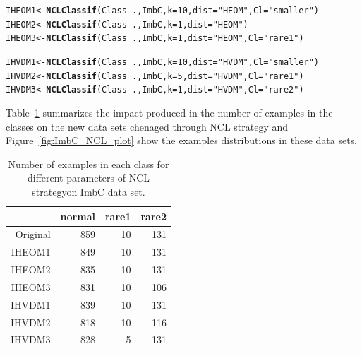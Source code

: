 \documentclass[10pt,a4paper]{article}\usepackage[]{graphicx}\usepackage[]{color}
\makeatletter
\newcommand{\hlnum}[1]{\textcolor[rgb]{0.686,0.059,0.569}{#1}}%
\newcommand{\hlstr}[1]{\textcolor[rgb]{0.192,0.494,0.8}{#1}}%
\newcommand{\hlopt}[1]{\textcolor[rgb]{0,0,0}{#1}}%
\newcommand{\hlstd}[1]{\textcolor[rgb]{0.345,0.345,0.345}{#1}}%
\newcommand{\hlkwb}[1]{\textcolor[rgb]{0.69,0.353,0.396}{#1}}%
\newcommand{\hlkwc}[1]{\textcolor[rgb]{0.333,0.667,0.333}{#1}}%
\newcommand{\hlkwd}[1]{\textcolor[rgb]{0.737,0.353,0.396}{\textbf{#1}}}%
\newenvironment{kframe}{%
 \def\at@end@of@kframe{}%
 \ifinner\ifhmode%
  \def\at@end@of@kframe{\end{minipage}}%
  \begin{minipage}{\columnwidth}%
 \fi\fi%
 \def\FrameCommand##1{\hskip\@totalleftmargin \hskip-\fboxsep
 \colorbox{shadecolor}{##1}\hskip-\fboxsep
     \hskip-\linewidth \hskip-\@totalleftmargin \hskip\columnwidth}%
 \MakeFramed {\advance\hsize-\width
   \@totalleftmargin\z@ \linewidth\hsize
   \@setminipage}}%
 {\par\unskip\endMakeFramed%
 \at@end@of@kframe}
\newenvironment{knitrout}{}{} %
\makeatother
\begin{document}
\begin{knitrout}\footnotesize
{}\color{fgcolor}\begin{kframe}
\begin{alltt}
\hlstd{IHEOM1} \hlkwb{<-} \hlkwd{NCLClassif}\hlstd{(Class}\hlopt{~}\hlstd{., ImbC,} \hlkwc{k}\hlstd{=}\hlnum{10}\hlstd{,} \hlkwc{dist}\hlstd{=}\hlstr{"HEOM"}\hlstd{,} \hlkwc{Cl}\hlstd{=}\hlstr{"smaller"}\hlstd{)}
\hlstd{IHEOM2} \hlkwb{<-} \hlkwd{NCLClassif}\hlstd{(Class}\hlopt{~}\hlstd{., ImbC,} \hlkwc{k}\hlstd{=}\hlnum{1}\hlstd{,} \hlkwc{dist}\hlstd{=}\hlstr{"HEOM"}\hlstd{)}
\hlstd{IHEOM3} \hlkwb{<-} \hlkwd{NCLClassif}\hlstd{(Class}\hlopt{~}\hlstd{., ImbC,} \hlkwc{k}\hlstd{=}\hlnum{1}\hlstd{,} \hlkwc{dist}\hlstd{=}\hlstr{"HEOM"}\hlstd{,} \hlkwc{Cl}\hlstd{=}\hlstr{"rare1"}\hlstd{)}

\hlstd{IHVDM1}\hlkwb{<-} \hlkwd{NCLClassif}\hlstd{(Class}\hlopt{~}\hlstd{., ImbC,} \hlkwc{k}\hlstd{=}\hlnum{10}\hlstd{,} \hlkwc{dist}\hlstd{=}\hlstr{"HVDM"}\hlstd{,} \hlkwc{Cl}\hlstd{=}\hlstr{"smaller"}\hlstd{)}
\hlstd{IHVDM2}\hlkwb{<-} \hlkwd{NCLClassif}\hlstd{(Class}\hlopt{~}\hlstd{., ImbC,} \hlkwc{k}\hlstd{=}\hlnum{5}\hlstd{,} \hlkwc{dist}\hlstd{=}\hlstr{"HVDM"}\hlstd{,} \hlkwc{Cl}\hlstd{=}\hlstr{"rare1"}\hlstd{)}
\hlstd{IHVDM3}\hlkwb{<-} \hlkwd{NCLClassif}\hlstd{(Class}\hlopt{~}\hlstd{., ImbC,} \hlkwc{k}\hlstd{=}\hlnum{1}\hlstd{,} \hlkwc{dist}\hlstd{=}\hlstr{"HVDM"}\hlstd{,} \hlkwc{Cl}\hlstd{=}\hlstr{"rare2"}\hlstd{)}
\end{alltt}
\end{kframe}
\end{knitrout}

Table~\ref{tab:ImbC_NCL_table} summarizes the impact produced in the number of examples in the classes on the new data sets chenaged through NCL strategy and Figure~\ref{fig:ImbC_NCL_plot} show the examples distributions in these data sets.


\begin{table}[ht]
\centering
\begin{tabular}{rrrr}
  \hline
 & normal & rare1 & rare2 \\ 
  \hline
Original & 859 &  10 & 131 \\ 
  IHEOM1 & 849 &  10 & 131 \\ 
  IHEOM2 & 835 &  10 & 131 \\ 
  IHEOM3 & 831 &  10 & 106 \\ 
  IHVDM1 & 839 &  10 & 131 \\ 
  IHVDM2 & 818 &  10 & 116 \\ 
  IHVDM3 & 828 &   5 & 131 \\ 
   \hline
\end{tabular}
\caption{Number of examples in each class for different parameters of NCL strategyon ImbC data set.} 
\label{tab:ImbC_NCL_table}
\end{table}
\end{document}
